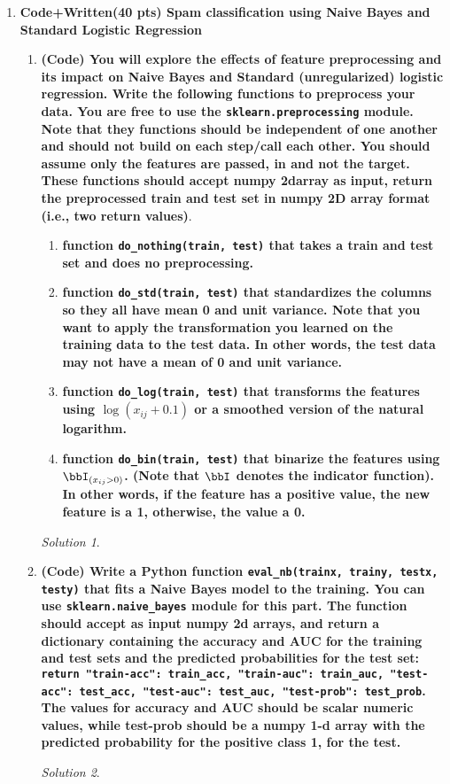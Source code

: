 \documentclass[a4paper,12pt]{article}
\theoremstyle{definition}
\theoremstyle{remark}
\newtheorem*{solution}{Solution}
\begin{document}
\begin{enumerate}
		\item{\bf Code+Written(40 pts) Spam classification using Naive Bayes and Standard Logistic Regression}
		\begin{enumerate}
			\item {\bf (Code) You will explore the effects of feature preprocessing and its impact on Naive Bayes and Standard (unregularized) logistic regression. Write the following functions to preprocess your data. You are free to use the \texttt{sklearn.preprocessing} module. Note that they functions should be independent of one another and should not build on each step/call each other. You should assume only the features are passed, in and not the target. These functions should accept numpy 2darray as input, return the preprocessed train and test set in numpy 2D array format (i.e., two return values)}.
				\begin{enumerate}
					\item {\bf  function \texttt{do\_nothing(train, test)} that takes a train and test set and does no preprocessing.}
					\item {\bf function \texttt{do\_std(train, test)} that standardizes the columns so they all have mean 0 and unit variance. Note that you want to apply the transformation you learned on the training data to the test data. In other words, the test data may not have a mean of 0 and unit variance.}
					\item {\bf function \texttt{do\_log(train, test)} that transforms the features using $\log(x_{ij} + 0.1)$ or a smoothed version of the natural logarithm.}
					\item {\bf function \texttt{do\_bin(train, test)} that binarize the features using $\bbI_{(x_{ij} >0)}$.  (Note that $\bbI$ denotes the indicator function). In other words, if the feature has a positive value, the new feature is a 1, otherwise, the value a 0.}
				\end{enumerate}

			\begin{solution}
				
			\end{solution}
			\item {\bf  (Code) Write a Python function \texttt{eval\_nb(trainx, trainy, testx, testy)} that fits a Naive Bayes model to the training. You can use \texttt{sklearn.naive\_bayes} module for this part. The function should accept as input numpy 2d arrays, and return a dictionary containing the accuracy and AUC for the training and test sets and the predicted probabilities for the test set: \\
				\texttt{return {"train-acc":
					train\_acc, "train-auc": train\_auc, "test-acc": test\_acc, "test-auc":
					test\_auc, "test-prob": test\_prob}}. \\
				The values for accuracy and AUC should be scalar
				numeric values, while test-prob should be a numpy 1-d array with the predicted probability for the positive class 1, for the test.}
			\begin{solution}
			

\end{solution}
\end{enumerate}
\end{enumerate}
\end{document}

